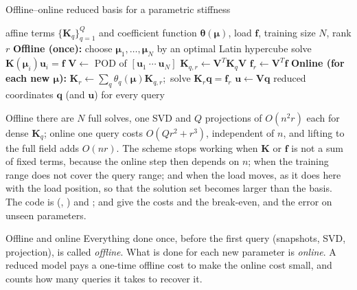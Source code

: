 \begin{algbox}{Offline--online reduced basis for a parametric stiffness}
\begin{pseudo}
\Require affine terms $\{\bm K_q\}_{q=1}^Q$ and coefficient function $\bm\theta(\bm\mu)$, load $\bm f$, training size $N$, rank $r$
\State \textbf{Offline (once):}
\State choose $\bm\mu_1,\dots,\bm\mu_N$ by an optimal Latin hypercube 
  \State solve $\bm K(\bm\mu_i)\bm u_i=\bm f$ 
\EndFor
\State $\bm V\gets$ POD of $[\bm u_1\ \cdots\ \bm u_N]$ 
  \State $\bm K_{q,r}\gets\bm V^T\bm K_q\bm V$
\EndFor
\State $\bm f_r\gets\bm V^T\bm f$
\State \textbf{Online (for each new $\bm\mu$):}
\State $\bm K_r\gets\sum_q\theta_q(\bm\mu)\bm K_{q,r}$;\ solve $\bm K_r\bm q=\bm f_r$
\State $\bm u\gets\bm V\bm q$ 
\Ensure reduced coordinates $\bm q$ (and $\bm u$) for every query
\end{pseudo}
\end{algbox}

Offline there are $N$ full solves, one SVD and $Q$ projections of $O(n^2r)$ each for dense $\bm K_q$; online one query costs $O(Qr^2+r^3)$, independent of $n$, and lifting to the full field adds $O(nr)$. The scheme stops working when $\bm K$ or $\bm f$ is not a sum of fixed terms, because the online step then depends on $n$; when the training range does not cover the query range; and when the load moves, as it does here with the load position, so that the solution set becomes larger than the basis. The code is  (, ) and ;  and  give the costs and the break-even, and  the error on unseen parameters.

\begin{sidenote}{Offline and online}
Everything done once, before the first query (snapshots, SVD, projection), is called \emph{offline}. What is done for each new parameter is \emph{online}. A reduced model pays a one-time offline cost to make the online cost small, and  counts how many queries it takes to recover it.
\end{sidenote}


